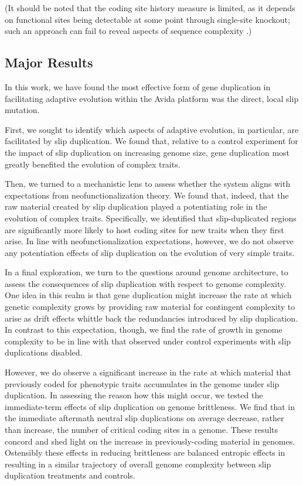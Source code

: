 (It should be noted that the coding site history measure is limited, as it depends on functional sites being detectable at some point through single-site knockout; such an approach can fail to reveal aspects of sequence complexity \citep{moreno2024cryptic}.)

\subsection{Major Results}

In this work, we have found the most effective form of gene duplication in facilitating adaptive evolution within the Avida platform was the direct, local slip mutation.

First, we sought to identify which aspects of adaptive evolution, in particular, are facilitated by slip duplication.
We found that, relative to a control experiment for the impact of slip duplication on increasing genome size, gene duplication most greatly benefited the evolution of complex traits.

Then, we turned to a mechanistic lens to assess whether the system aligns with expectations from neofunctionalization theory.
We found that, indeed, that the raw material created by slip duplication played a potentiating role in the evolution of complex traits.
Specifically, we identified that slip-duplicated regions are significantly more likely to host coding sites for new traits when they first arise.
In line with neofunctionalization expectations, however, we do not observe any potentiation effects of slip duplication on the evolution of very simple traits.

In a final exploration, we turn to the questions around genome architecture, to assess the consequences of slip duplication with respect to genome complexity.
One idea in this realm is that gene duplication might increase the rate at which genetic complexity grows by providing raw material for contingent complexity to arise as drift effects whittle back the redundancies introduced by slip duplication.
In contrast to this expectation, though, we find the rate of growth in genome complexity to be in line with that observed under control experiments with slip duplications disabled.

However, we do observe a significant increase in the rate at which material that previously coded for phenotypic traits accumulates in the genome under slip duplication.
In assessing the reason how this might occur, we tested the immediate-term effects of slip duplication on genome brittleness.
We find that in the immediate aftermath neutral slip duplications on average decrease, rather than increase, the number of critical coding sites in a genome.
These results concord and shed light on the increase in previously-coding material in genomes.
Ostensibly these effects in reducing brittleness are balanced entropic effects in resulting in a similar trajectory of overall genome complexity between slip duplication treatments and controls.

